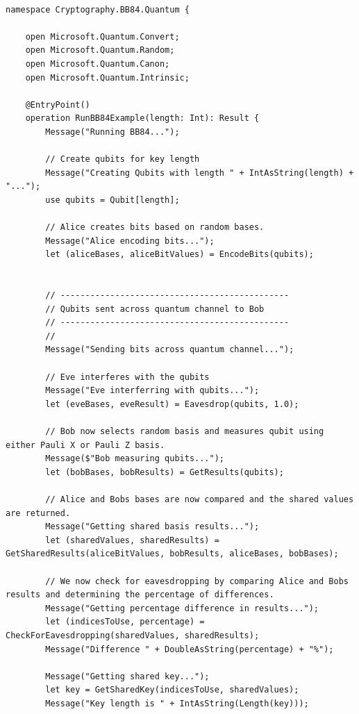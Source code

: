 \documentclass{article}
\begin{document}
\begin{lstlisting}[language={[Sharp]C}, caption={Q\# Microsoft Quantum Development Kit}, label={Script}]

namespace Cryptography.BB84.Quantum {

    open Microsoft.Quantum.Convert;
    open Microsoft.Quantum.Random;
    open Microsoft.Quantum.Canon;
    open Microsoft.Quantum.Intrinsic;
    
    @EntryPoint()
    operation RunBB84Example(length: Int): Result {
        Message("Running BB84...");

        // Create qubits for key length
        Message("Creating Qubits with length " + IntAsString(length) + "...");
        use qubits = Qubit[length];

        // Alice creates bits based on random bases.
        Message("Alice encoding bits...");
        let (aliceBases, aliceBitValues) = EncodeBits(qubits);


        // ----------------------------------------------
        // Qubits sent across quantum channel to Bob
        // ----------------------------------------------
        //
        Message("Sending bits across quantum channel...");

        // Eve interferes with the qubits
        Message("Eve interferring with qubits...");
        let (eveBases, eveResult) = Eavesdrop(qubits, 1.0);

        // Bob now selects random basis and measures qubit using either Pauli X or Pauli Z basis.
        Message($"Bob measuring qubits...");
        let (bobBases, bobResults) = GetResults(qubits);

        // Alice and Bobs bases are now compared and the shared values are returned.
        Message("Getting shared basis results...");
        let (sharedValues, sharedResults) = GetSharedResults(aliceBitValues, bobResults, aliceBases, bobBases);

        // We now check for eavesdropping by comparing Alice and Bobs results and determining the percentage of differences.
        Message("Getting percentage difference in results...");
        let (indicesToUse, percentage) = CheckForEavesdropping(sharedValues, sharedResults);  
        Message("Difference " + DoubleAsString(percentage) + "%");
         
        Message("Getting shared key...");
        let key = GetSharedKey(indicesToUse, sharedValues);
        Message("Key length is " + IntAsString(Length(key)));


\end{lstlisting}
\end{document}

